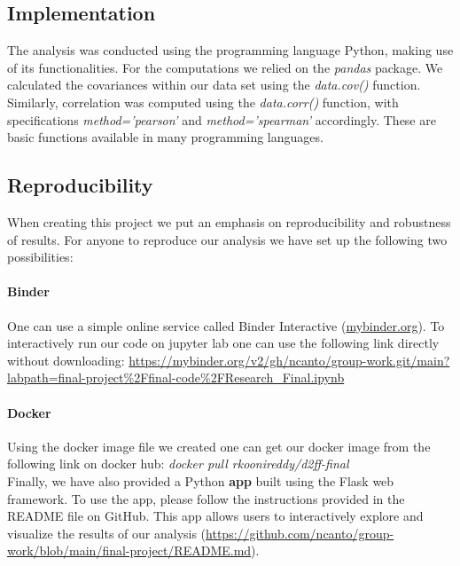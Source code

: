 \subsection{Implementation}
The analysis was conducted using the programming language Python, making use of its functionalities. For the computations we relied on the \emph{pandas} package. We calculated the covariances within our data set using the \emph{data.cov()} function. Similarly, correlation was computed using the \emph{data.corr()} function, with specifications \emph{method='pearson'} and \emph{method='spearman'} accordingly. These are basic functions available in many programming languages.

\subsection{Reproducibility}
When creating this project we put an emphasis on reproducibility and robustness of results. For anyone to reproduce our analysis we have set up the following two possibilities:

\paragraph{Binder} One can use a simple online service called Binder Interactive (\url{mybinder.org}). To interactively run our code on jupyter lab one can use the following link directly without downloading: \url{https://mybinder.org/v2/gh/ncanto/group-work.git/main?labpath=final-project\%2Ffinal-code\%2FResearch\_Final.ipynb}

\paragraph{Docker} Using the docker image file we created one can get our docker image from the following link on docker hub: \emph{docker pull rkoonireddy/d2ff-final}\\


Finally, we have also provided a Python \textbf{app} built using the Flask web framework. To use the app, please follow the instructions provided in the README file on GitHub. This app allows users to interactively explore and visualize the results of our analysis (\url{https://github.com/ncanto/group-work/blob/main/final-project/README.md}).


